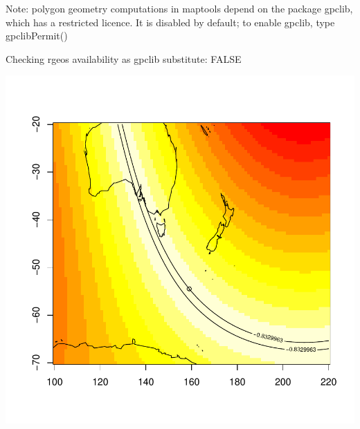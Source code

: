 \documentclass[12pt,a4paper]{article}
\begin{document}
\begin{Schunk}
\begin{Soutput}
	Note: polygon geometry computations in maptools
 	depend on the package gpclib, which has a
 	restricted licence. It is disabled by default;
 	to enable gpclib, type gpclibPermit()

Checking rgeos availability as gpclib substitute:
FALSE 
\end{Soutput}
\end{Schunk}
\includegraphics{geolPlots-001}
\end{document}
